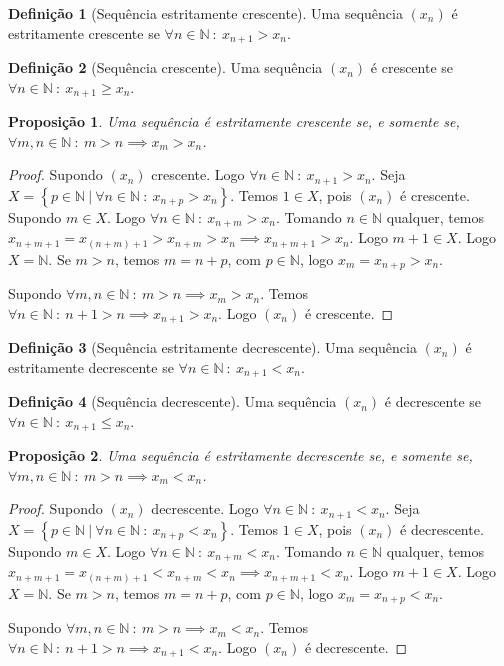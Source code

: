 \documentclass{article}
\newtheorem{prop}{Proposição}[section]
\theoremstyle{theorem}
\theoremstyle{lemma}
\theoremstyle{definition}
\newtheorem{definicao}{Definição}[section]
\theoremstyle{remark}
\begin{document}
\begin{definicao}[Sequência estritamente crescente]
	Uma sequência $(x_n)$ é estritamente crescente se $\forall n \in \mathbb{N} \: : \: x_{n+1} > x_n$.
\end{definicao}
\begin{definicao}[Sequência crescente]
	Uma sequência $(x_n)$ é crescente se $\forall n \in \mathbb{N} \: : \: x_{n+1} \geq x_n$.
\end{definicao}
\begin{prop}
	Uma sequência é estritamente crescente se, e somente se, $\forall m,n\in \mathbb{N} \: : \: m > n \implies x_m > x_n$.
\end{prop}
\begin{proof}
	Supondo $(x_n)$ crescente. Logo $\forall n \in \mathbb{N} \: : \: x_{n+1} > x_n$. Seja $X = \left\{ p\in \mathbb{N} \: | \:\forall n \in \mathbb{N} \: : \: x_{n+p} > x_n\right\}$. Temos $1\in X$, pois $(x_n)$ é crescente. Supondo $m \in X$. Logo $\forall n \in \mathbb{N} \: : \: x_{n+m} > x_n$. Tomando $n\in \mathbb{N}$ qualquer, temos $x_{n+m+1} = x_{(n+m)+1} > x_{n+m} > x_n \implies x_{n+m+1} > x_n$. Logo $m+1\in X$. Logo $X = \mathbb{N}$. Se $m>n$, temos $m = n+p$, com $p\in \mathbb{N}$, logo $x_{m} = x_{n+p} > x_n$. 

	Supondo $\forall m,n\in \mathbb{N} \: : \: m > n \implies x_m > x_n$. Temos $\forall n \in \mathbb{N} \: : \:  n+1 > n \implies x_{n+1} > x_n$. Logo $(x_n)$ é crescente.
\end{proof}
\begin{definicao}[Sequência estritamente decrescente]
	Uma sequência $(x_n)$ é   estritamente decrescente se $\forall n \in \mathbb{N} \: : \: x_{n+1} < x_n$.
\end{definicao}
\begin{definicao}[Sequência decrescente]
	Uma sequência $(x_n)$ é decrescente se $\forall n \in \mathbb{N} \: : \: x_{n+1} \leq x_n$.
\end{definicao}
\begin{prop}
	Uma sequência é estritamente decrescente se, e somente se, $\forall m,n\in \mathbb{N} \: : \: m > n \implies x_m < x_n$.
\end{prop}
\begin{proof}
	Supondo $(x_n)$ decrescente. Logo $\forall n \in \mathbb{N} \: : \: x_{n+1} < x_n$. Seja $X = \left\{ p\in \mathbb{N} \: | \:\forall n \in \mathbb{N} \: : \: x_{n+p} < x_n\right\}$. Temos $1\in X$, pois $(x_n)$ é decrescente. Supondo $m \in X$. Logo $\forall n \in \mathbb{N} \: : \: x_{n+m} < x_n$. Tomando $n\in \mathbb{N}$ qualquer, temos $x_{n+m+1} = x_{(n+m)+1} < x_{n+m} < x_n \implies x_{n+m+1} < x_n$. Logo $m+1\in X$. Logo $X = \mathbb{N}$. Se $m>n$, temos $m = n+p$, com $p\in \mathbb{N}$, logo $x_{m} = x_{n+p} < x_n$. 

	Supondo $\forall m,n\in \mathbb{N} \: : \: m > n \implies x_m < x_n$. Temos $\forall n \in \mathbb{N} \: : \:  n+1 > n \implies x_{n+1} < x_n$. Logo $(x_n)$ é decrescente.
\end{proof}
\end{document}
